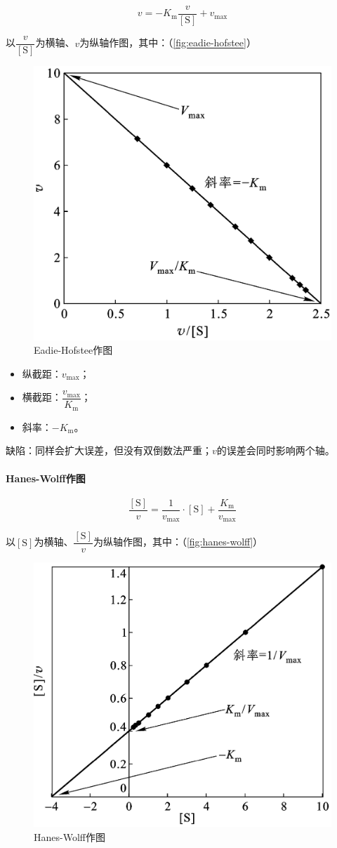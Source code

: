 \[v = -K_{\text{m}} \frac{v}{[\text{S}]} + v_{\text{max}}\]

以$\dfrac{v}{[\text{S}]}$为横轴、$v$为纵轴作图，其中：（\autoref{fig:eadie-hofstee}）

\begin{figure}[htbp]
	\centering
	\includegraphics[width=0.5\linewidth]{Pics/Eadie-Hofstee作图}
	\caption{Eadie-Hofstee作图}
	\label{fig:eadie-hofstee}
\end{figure}

\begin{itemize}
	\item 纵截距：$v_{\text{max}}$；
	\item 横截距：$\dfrac{v_{\text{max}}}{K_{\text{m}}}$；
	\item 斜率：$-K_{\text{m}}$。
\end{itemize}

缺陷：同样会扩大误差，但没有双倒数法严重；$v$的误差会同时影响两个轴。

\paragraph{Hanes-Wolff作图}

\[\frac{[\text{S}]}{v} = \frac{1}{v_{\text{max}}} \cdot [\text{S}] + \frac{K_{\text{m}}}{v_{\text{max}}}\]

以$[\text{S}]$为横轴、$\dfrac{[\text{S}]}{v}$为纵轴作图，其中：（\autoref{fig:hanes-wolff}）

\begin{figure}[htbp]
	\centering
	\includegraphics[width=0.5\linewidth]{"Pics/Hanes-Wolff 作图"}
	\caption{Hanes-Wolff作图}
	\label{fig:hanes-wolff}
\end{figure}

